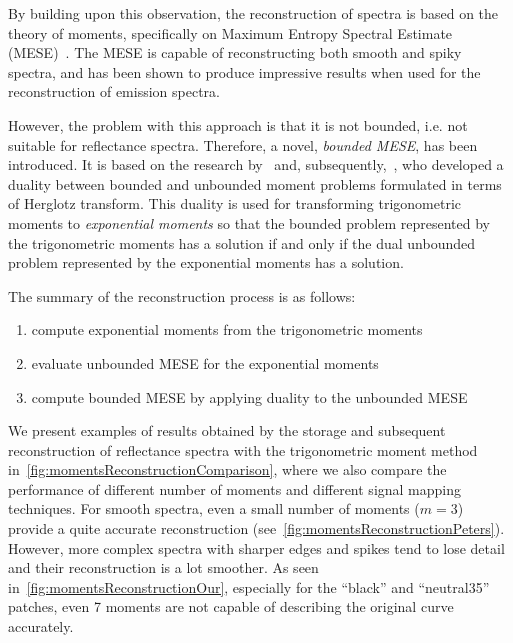 By building upon this observation, the reconstruction of spectra is based on the theory of moments, specifically on Maximum Entropy Spectral Estimate (MESE)~\cite{unboundedMESEoriginal}. The MESE is capable of reconstructing both smooth and spiky spectra, and has been shown to produce impressive results when used for the reconstruction of emission spectra.

However, the problem with this approach is that it is not bounded, i.e. not suitable for reflectance spectra. Therefore, a novel, \emph{bounded MESE}, has been introduced. It is based on the research by~\citet{dualityBoundedUnboundedMarkoff} and, subsequently,~\citet{dualityBoundedUnboundedKrein}, who developed a duality between bounded and unbounded moment problems formulated in terms of Herglotz transform. This duality is used for transforming trigonometric moments to \emph{exponential moments} so that the bounded problem represented by the trigonometric moments has a solution if and only if the dual unbounded problem represented by the exponential moments has a solution.

The summary of the reconstruction process is as follows:
\begin{enumerate}
	\item compute exponential moments from the trigonometric moments
	\item evaluate unbounded MESE for the exponential moments
	\item compute bounded MESE by applying duality to the unbounded MESE
\end{enumerate}

We present examples of results obtained by the storage and subsequent reconstruction of reflectance spectra with the trigonometric moment method in~\cref{fig:momentsReconstructionComparison}, where we also compare the performance of different number of moments and different signal mapping techniques. For smooth spectra, even a small number of moments ($m=3$) provide a quite accurate reconstruction (see~\cref{fig:momentsReconstructionPeters}). However, more complex spectra with sharper edges and spikes tend to lose detail and their reconstruction is a lot smoother. As seen in~\cref{fig:momentsReconstructionOur}, especially for the ``black'' and ``neutral35'' patches, even 7 moments are not capable of describing the original curve accurately.

